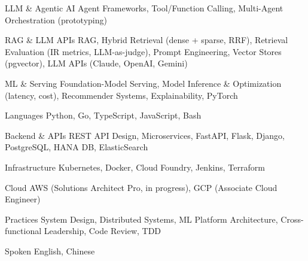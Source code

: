 

\begin{cvskills}

  \cvskill
    {LLM \& Agentic AI} %
    {Agent Frameworks, Tool/Function Calling, Multi-Agent Orchestration (prototyping)} %

  \cvskill
    {RAG \& LLM APIs} %
    {RAG, Hybrid Retrieval (dense + sparse, RRF), Retrieval Evaluation (IR metrics, LLM-as-judge), Prompt Engineering, Vector Stores (pgvector), LLM APIs (Claude, OpenAI, Gemini)} %

  \cvskill
    {ML \& Serving} %
    {Foundation-Model Serving, Model Inference \& Optimization (latency, cost), Recommender Systems, Explainability, PyTorch} %

  \cvskill
    {Languages} %
    {Python, Go, TypeScript, JavaScript, Bash} %

  \cvskill
    {Backend \& APIs} %
    {REST API Design, Microservices, FastAPI, Flask, Django, PostgreSQL, HANA DB, ElasticSearch} %

  \cvskill
    {Infrastructure} %
    {Kubernetes, Docker, Cloud Foundry, Jenkins, Terraform} %

  \cvskill
    {Cloud} %
    {AWS (Solutions Architect Pro, in progress), GCP (Associate Cloud Engineer)} %

  \cvskill
    {Practices} %
    {System Design, Distributed Systems, ML Platform Architecture, Cross-functional Leadership, Code Review, TDD} %

  \cvskill
    {Spoken} %
    {English, Chinese} %


\end{cvskills}
